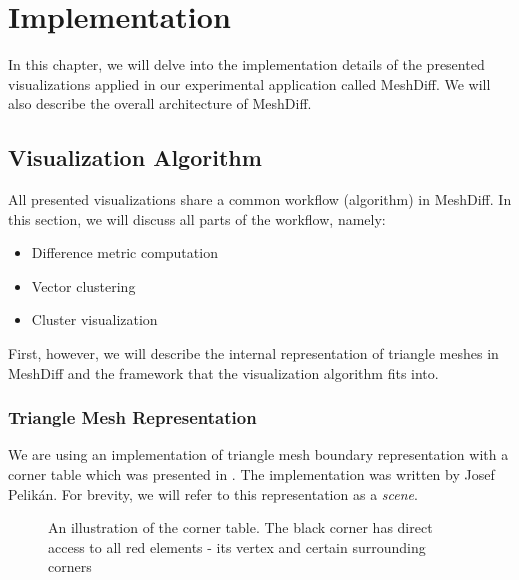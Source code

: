 \chapter{Implementation}

In this chapter, we will delve into the implementation details of the presented visualizations applied in our experimental application called MeshDiff. We will also describe the overall architecture of MeshDiff.

\section{Visualization Algorithm}
\label{sec:implementation_algorithm}

All presented visualizations share a common workflow (algorithm) in MeshDiff. In this section, we will discuss all parts of the workflow, namely:

\begin{itemize}
\item Difference metric computation
\item Vector clustering
\item Cluster visualization
\end{itemize}

First, however, we will describe the internal representation of triangle meshes in MeshDiff and the framework that the visualization algorithm fits into.

\subsection{Triangle Mesh Representation}
\label{sec:mesh_representation}

We are using an implementation of triangle mesh boundary representation with a corner table which was presented in \citet{Corner03}. The implementation was written by Josef Pelikán. For brevity, we will refer to this representation as a {\it scene}.

\begin{figure}[h]
\centering
\def\svgwidth{0.5\textwidth}

\caption[Corner Table Illustration]{An illustration of the corner table. The black corner has direct access to all red elements - its vertex and certain surrounding corners}
\label{fig:corner_table}
\end{figure}


